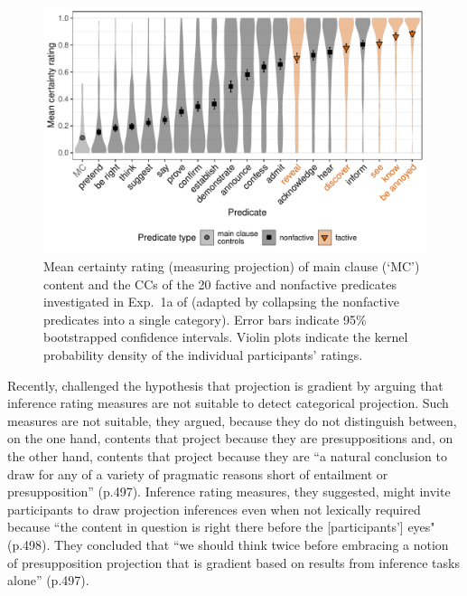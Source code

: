 \documentclass[11pt,fleqn]{article}
\newcommand{\6}{\mbox{$[\hspace*{-.6mm}[$}}
\newcommand{\9}{\mbox{$]\hspace*{-.6mm}]$}}
\begin{document}
\begin{figure}[h!]
\centering
\includegraphics[width=.8\textwidth]{../../results/main/graphs/mean-certainty-by-predicateType}
\caption{Mean certainty rating (measuring projection) of main clause (`MC') content and the CCs of the 20 \color{orange}factive \color{black} and \color{green}nonfactive \color{black} predicates investigated in Exp.~1a of \citealt{degen-tonhauser-language} (adapted by collapsing the nonfactive predicates into a single category). Error bars indicate 95\% bootstrapped confidence intervals. Violin plots indicate the kernel probability density of the individual participants' ratings.}\label{fig:dt1a}
\end{figure}

Recently,  \citealt*[\S6.2]{mandelkern-etal2020} challenged the hypothesis that projection is gradient by arguing that inference rating measures are not suitable to detect categorical projection. Such measures are not suitable, they argued, because they do not distinguish between, on the one hand, contents that project because they are presuppositions and, on the other hand, contents that project because they are ``a natural conclusion to draw for any of a variety of pragmatic reasons short of entailment or presupposition'' (p.497). Inference rating measures, they suggested, might invite participants to draw projection inferences even when not lexically required because ``the content in question is right there before the [participants'] eyes" (p.498). They concluded that ``we should think twice before embracing a notion of presupposition projection that is gradient based on results from inference tasks alone'' (p.497).
\end{document}
